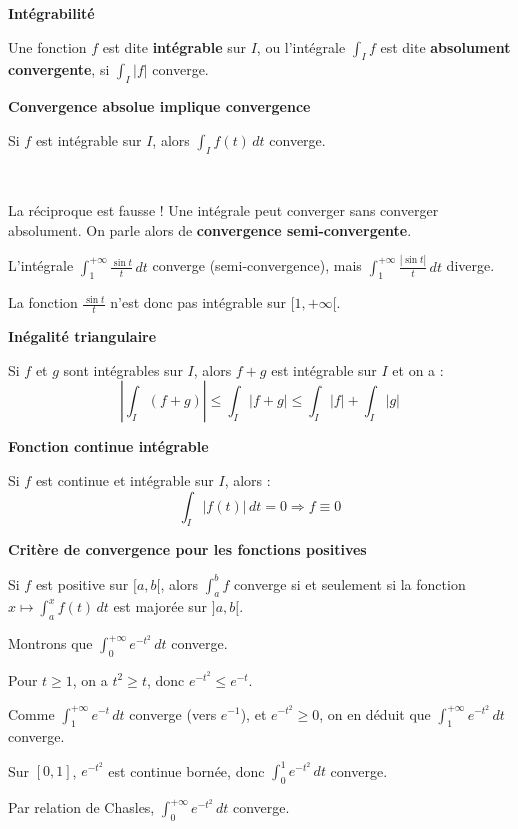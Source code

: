 \documentclass[../PolyS4.tex]{subfiles}
\begin{document}
\begin{Def}
\textbf{Intégrabilité}

Une fonction $f$ est dite \textbf{intégrable} sur $I$, ou l'intégrale $\displaystyle\int_{I} f$ est dite \textbf{absolument convergente}, si $\displaystyle\int_{I}|f|$ converge.
\end{Def}

\begin{Thm}
\textbf{Convergence absolue implique convergence}

Si $f$ est intégrable sur $I$, alors $\displaystyle\int_{I} f(t) \, dt$ converge.
\end{Thm}

\begin{Rmq}$\,$

La réciproque est fausse ! Une intégrale peut converger sans converger absolument. On parle alors de \textbf{convergence semi-convergente}.
\end{Rmq}

\begin{Ex}
L'intégrale $\displaystyle\int_{1}^{+\infty} \frac{\sin t}{t} \, dt$ converge (semi-convergence), mais $\displaystyle\int_{1}^{+\infty} \frac{|\sin t|}{t} \, dt$ diverge.

La fonction $\frac{\sin t}{t}$ n'est donc pas intégrable sur $[1, +\infty[$.
\end{Ex}

\begin{Prop}
\textbf{Inégalité triangulaire}

Si $f$ et $g$ sont intégrables sur $I$, alors $f + g$ est intégrable sur $I$ et on a :
$$\left|\int_{I}(f + g)\right| \leq \int_{I}|f + g| \leq \int_{I}|f| + \int_{I}|g|$$
\end{Prop}

\begin{Prop}
\textbf{Fonction continue intégrable}

Si $f$ est continue et intégrable sur $I$, alors :
$$\int_{I}|f(t)| \, dt = 0 \Rightarrow f \equiv 0$$
\end{Prop}

\begin{Thm}
\textbf{Critère de convergence pour les fonctions positives}

Si $f$ est positive sur $[a, b[$, alors $\displaystyle\int_{a}^{b} f$ converge si et seulement si la fonction $x \mapsto \int_{a}^{x} f(t) \, dt$ est majorée sur $]a, b[$.
\end{Thm}

\begin{Ex}
Montrons que $\displaystyle\int_{0}^{+\infty} e^{-t^2} \, dt$ converge.

Pour $t \geq 1$, on a $t^2 \geq t$, donc $e^{-t^2} \leq e^{-t}$.

Comme $\displaystyle\int_{1}^{+\infty} e^{-t} \, dt$ converge (vers $e^{-1}$), et $e^{-t^2} \geq 0$, on en déduit que $\displaystyle\int_{1}^{+\infty} e^{-t^2} \, dt$ converge.

Sur $[0, 1]$, $e^{-t^2}$ est continue bornée, donc $\displaystyle\int_{0}^{1} e^{-t^2} \, dt$ converge.

Par relation de Chasles, $\displaystyle\int_{0}^{+\infty} e^{-t^2} \, dt$ converge.
\end{Ex}
\end{document}
